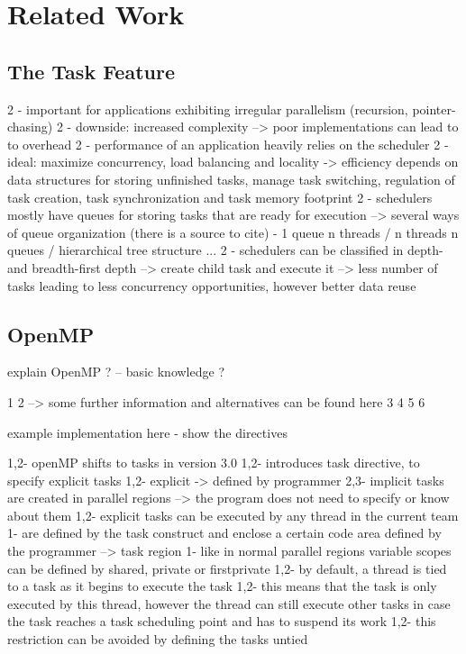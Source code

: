 \section{Related Work}

\subsection{The Task Feature}
 2 - important for applications exhibiting irregular parallelism (recursion, pointer-chasing)
 2 - downside: increased complexity --> poor implementations can lead to to overhead
 2 - performance of an application heavily relies on the scheduler
 2 - ideal: maximize concurrency, load balancing and locality
 	-> efficiency depends on data structures for storing unfinished tasks, manage task switching, regulation of task creation, task synchronization and task memory footprint
 2 - schedulers mostly have queues for storing tasks that are ready for execution
 	--> several ways of queue organization (there is a source to cite)
 		- 1 queue n threads / n threads n queues / hierarchical tree structure ...
 2 - schedulers can be classified in depth- and breadth-first 
 	depth --> create child task and execute it --> less number of tasks leading to less concurrency opportunities, however better data reuse
 	

\subsection{OpenMP}

explain OpenMP ? -- basic knowledge ?

1\cite{Ayguade.2009}
2\cite{LaGrone.2011} --> some further information and alternatives can be found here
3\cite{MKlemm.2018}
4\cite{Qawasmeh.2014}
5\cite{Duran.2008}
6\cite{Furlinger.2009}

example implementation here - show the directives

  1,2- openMP shifts to tasks in version 3.0
  1,2- introduces task directive, to specify explicit tasks
  	1,2- explicit -> defined by programmer
    2,3- implicit tasks are created in parallel regions 
    --> the program does not need to specify or know about them
  1,2- explicit tasks can be executed by any thread in the current team
  1- are defined by the task construct and enclose a certain code area defined by the programmer --> task region
  1- like in normal parallel regions variable scopes can be defined by shared, private or firstprivate
  1,2- by default, a thread is tied to a task as it begins to execute the task
    1,2- this means that the task is only executed by this thread, however the thread can still execute other tasks in case the task reaches a task scheduling point and has to suspend its work
    1,2- this restriction can be avoided by defining the tasks untied
    
